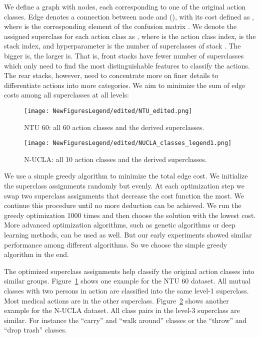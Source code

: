 \documentclass{article}
\begin{document}
{We define a graph with  nodes, each corresponding to one of the original action classes. Edge  denotes a connection between node  and  (), with its cost defined as , where  is the corresponding element of the confusion matrix . We denote the assigned superclass for each action class as , where  is the action class index,  is the stack index, and hyperparameter  is the number of superclasses of stack . The bigger  is, the larger  is. That is, front stacks have fewer number of superclasses which only need to find the most distinguishable features to classify the actions. The rear stacks, however, need to concentrate more on finer details to differentiate actions into more categories. We aim to minimize the sum of edge costs among all superclasses at all levels:

}

\begin{figure}[tbh]
\centering
\texttt{[image: NewFiguresLegend/edited/NTU\_edited.png]}
\caption{NTU 60: all 60 action classes and the derived superclasses. }
\label{fig:ntu_classes}
\end{figure}

\begin{figure}[tbh]
\centering
\texttt{[image: NewFiguresLegend/edited/NUCLA\_classes\_legend1.png]}
\caption{N-UCLA: all 10 action classes and the derived superclasses.}
\label{fig:nucla_classes}
\end{figure}

{We use a simple greedy algorithm to minimize the total edge cost. We initialize the superclass assignments randomly but evenly. At each optimization step we swap two superclass assignments that decrease the cost function the most. We continue this procedure until no more deduction can be achieved. We run the greedy optimization 1000 times and then choose the solution with the lowest cost. More advanced optimization algorithms, such as genetic algorithms or deep learning methods, can be used as well. But our early experiments showed similar performance among different algorithms. So we choose the simple greedy algorithm in the end.}

{The optimized superclass assignments help classify the original action classes into similar groups. Figure~\ref{fig:ntu_classes} shows one example for the NTU 60 dataset. All mutual classes with two persons in action are classified into the same level-1 superclass. Most medical actions are in the other superclass. Figure~\ref{fig:nucla_classes} shows another example for the N-UCLA dataset. All class pairs in the level-3 superclass are similar. For instance the ``carry'' and ``walk around'' classes or the ``throw'' and ``drop trash'' classes.}
\end{document}
